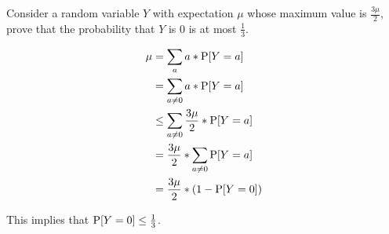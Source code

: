 \question Consider a random variable $Y$ with expectation $\mu$ whose 
maximum value is $\frac{3\mu}{2}$, prove that the probability that $Y$ 
is 0 is at most $\frac{1}{3}$. 
\begin{solution}[3cm]
\begin{equation}
\begin{split}
\mu &= \sum_a a * \P[Y=a] \\ \nonumber
&= \sum_{a\neq 0} a * \P[Y=a] \\
&\leq \sum_{a\neq 0} \frac{3 \mu}{2} * \P[Y=a]  \\
&= \frac{3 \mu}{2} * \sum_{a\neq 0} \P[Y=a]  \\
&=  \frac{3 \mu}{2} * (1 - \P[Y = 0]) 
\end{split}
\end{equation}

This implies that $\P[Y = 0] \leq \frac{1}{3}$. 
\end{solution}